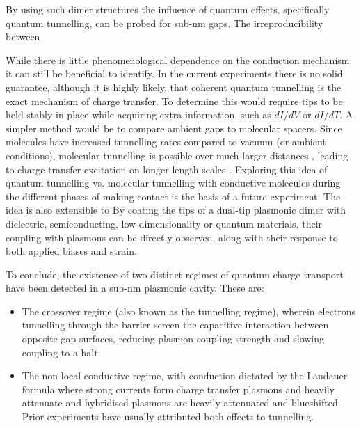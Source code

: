 \documentclass[12pt, a4paper, twoside]{book}
\begin{document}
By using such dimer structures the influence of quantum effects, specifically quantum tunnelling, can be probed for sub-nm gaps. The irreproducibility between

While there is little phenomenological dependence on the conduction mechanism it can still be beneficial to identify. In the current experiments there is no solid guarantee, although it is highly likely, that coherent quantum tunnelling is the exact mechanism of charge transfer. To determine this would require tips to be held stably in place while acquiring extra information, such as $dI/dV$ or $dI/dT$. A simpler method would be to compare ambient gaps to molecular spacers. Since molecules have increased tunnelling rates compared to vacuum (or ambient conditions), molecular tunnelling is possible over much larger distances \cite{tan2014}, leading to charge transfer excitation on longer length scales \cite{benz2014}. Exploring this idea of quantum tunnelling vs. molecular tunnelling with conductive molecules during the different phases of making contact is the basis of a future experiment. The idea is also extensible to By coating the tips of a dual-tip plasmonic dimer with dielectric, semiconducting, low-dimensionality or quantum materials, their coupling with plasmons can be directly observed, along with their response to both applied biases and strain.

To conclude, the existence of two distinct regimes of quantum charge transport have been detected in a sub-nm plasmonic cavity. These are:
\begin{itemize}
\item The crossover regime (also known as the tunnelling regime), wherein electrons tunnelling through the barrier screen the capacitive interaction between opposite gap surfaces, reducing plasmon coupling strength and slowing coupling to a halt.
\item The non-local conductive regime, with conduction dictated by the Landauer formula where strong currents form charge transfer plasmons and heavily attenuate and hybridised plasmons are heavily attenuated and blueshifted.
Prior experiments have usually attributed both effects to tunnelling.
\end{itemize}

\ifstandalone
\begin{singlespace}
\fontsize{8pt}{1em}\selectfont
\printbibliography[notcategory=fullcited]
\end{singlespace}
\fi
\end{document}
